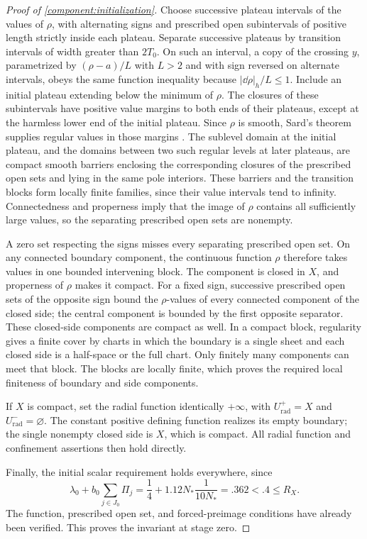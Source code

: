 \begin{proof}[Proof of \cref{component:initialization}]
Choose successive plateau intervals of the values of $\rho$, with
alternating signs and prescribed open subintervals of positive length
strictly inside each plateau.  Separate successive plateaus by transition intervals of
width greater than $2T_0$.  On such an interval, a copy of the crossing
$y$, parametrized by $(\rho-a)/L$ with $L>2$ and with sign reversed
on alternate intervals, obeys the same function inequality because
$|\dd\rho|_h/L\le1$.  Include an initial plateau extending below the
minimum of $\rho$.  The closures of these subintervals have positive value margins to
both ends of their plateaus, except at the harmless lower end of the
initial plateau. Since $\rho$ is smooth, Sard's theorem supplies
regular values in those margins
\citep[Chapter~2, Remark~6.5]{simonGMT}. The sublevel domain at the initial plateau, and the domains
between two such regular levels at later plateaus, are compact smooth
barriers enclosing the corresponding closures of the prescribed open sets and lying in the
same pole interiors.  These barriers and the transition blocks form
locally finite families, since their value intervals tend to infinity.
Connectedness and properness imply that the image of $\rho$ contains
all sufficiently large values, so the separating prescribed open sets are nonempty.

A zero set respecting the signs misses every separating prescribed open set.  On any connected boundary component, the continuous function
$\rho$ therefore takes values in one bounded intervening block.
The component is closed in $X$, and properness of $\rho$ makes it
compact.  For a fixed sign, successive prescribed open sets of the opposite
sign bound the $\rho$-values of every connected component of the
closed side; the central component is bounded by the first opposite
separator.  These closed-side components are compact as well.
In a compact block, regularity gives a finite cover by charts in
which the boundary is a single sheet and each closed side is a half-space
or the full chart.  Only finitely many components can meet that block.
The blocks are locally finite, which proves the required local
finiteness of boundary and side components.

If $X$ is compact, set the radial function identically $+\infty$, with
$U_{\mathrm{rad}}^+=X$ and $U_{\mathrm{rad}}^-=\varnothing$.
The constant positive defining function realizes its empty boundary;
the single nonempty closed side is $X$, which is compact.  All radial
function and confinement assertions then hold directly.

Finally, the initial scalar requirement holds everywhere, since
\[
 \lambda_0+b_0\sum_{j\in J_0}\Pi_j
 =\frac14+1.12N_*\frac{1}{10N_*}
 =.362<.4\le R_X.
\]
The function, prescribed open set, and forced-preimage conditions have already been
verified.  This proves the invariant at stage zero.
\end{proof}

